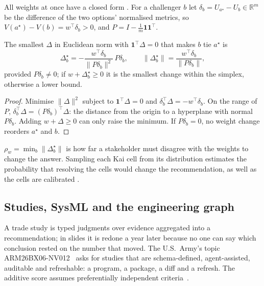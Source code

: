 All weights at once have a closed form \proposed. For a challenger $b$ let
$\delta_b = U_{a^\star} - U_b \in \mathbb{R}^m$ be the difference of the two
options' normalised metrics, so $V(a^\star) - V(b) = w^{\top}\delta_b > 0$, and
$P = I - \tfrac{1}{m}\mathbf{1}\mathbf{1}^{\top}$.

\begin{proposition}
\label{prop:weights}
The smallest $\Delta$ in Euclidean norm with $\mathbf{1}^{\top}\Delta = 0$ that
makes $b$ tie $a^\star$ is
\begin{equation}
  \Delta^\star_b = -\frac{w^{\top}\delta_b}{\lVert P\delta_b\rVert^2}\,P\delta_b,
  \qquad
  \lVert \Delta^\star_b \rVert = \frac{w^{\top}\delta_b}{\lVert P\delta_b\rVert},
\end{equation}
provided $P\delta_b \ne 0$; if $w + \Delta^\star_b \ge 0$ it is the smallest
change within the simplex, otherwise a lower bound.
\end{proposition}
\begin{proof}
Minimise $\lVert\Delta\rVert^2$ subject to $\mathbf{1}^{\top}\Delta = 0$ and
$\delta_b^{\top}\Delta = -w^{\top}\delta_b$. On the range of $P$,
$\delta_b^{\top}\Delta = (P\delta_b)^{\top}\Delta$: the distance from the origin
to a hyperplane with normal $P\delta_b$. Adding $w + \Delta \ge 0$ can only raise
the minimum. If $P\delta_b = 0$, no weight change reorders $a^\star$ and $b$.
\end{proof}

$\rho_w = \min_b \lVert\Delta^\star_b\rVert$ is how far a stakeholder must
disagree with the weights to change the answer. Sampling each Kai cell from its
distribution estimates the probability that resolving the cells would change
the recommendation, as well as the cells are calibrated \proposed.

\subsection{Studies, SysML and the engineering graph}

A trade study is typed judgments over evidence aggregated into a
recommendation; in slides it is redone a year later because no one can say
which conclusion rested on the number that moved. The U.S.\ Army's topic
ARM26BX06-NV012~\cite{armysbir} asks for studies that are schema-defined,
agent-assisted, auditable and refreshable: a program, a package, a diff and a
refresh. The additive score assumes preferentially independent
criteria~\cite{keeney1976}.

